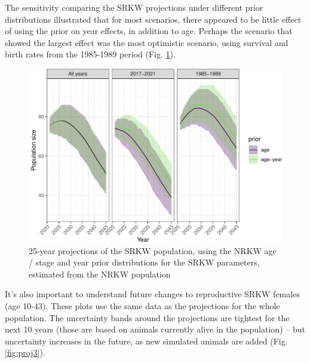 \documentclass[]{article}
\begin{document}
The sensitivity comparing the SRKW projections under different prior
distributions illustrated that for most scenarios, there appeared to be
little effect of using the prior on year effects, in addition to age.
Perhaps the scenario that showed the largest effect was the most
optimistic scenario, using survival and birth rates from the 1985-1989
period (Fig. \ref{fig:proj2}).

\begin{figure}
\centering
\includegraphics{status_update_files/figure-latex/proj2-1.pdf}
\caption{25-year projections of the SRKW population, using the NRKW age
/ stage and year prior distributions for the SRKW parameters, estimated
from the NRKW population \label{fig:proj2}}
\end{figure}

It's also important to understand future changes to reproductive SRKW
females (age 10-43). These plots use the same data as the projections
for the whole population. The uncertainty bands around the projections
are tightest for the next 10 years (those are based on animals currently
alive in the population) -- but uncertainty increases in the future, as
new simulated animals are added (Fig. \ref{fig:proj3}).
\end{document}
